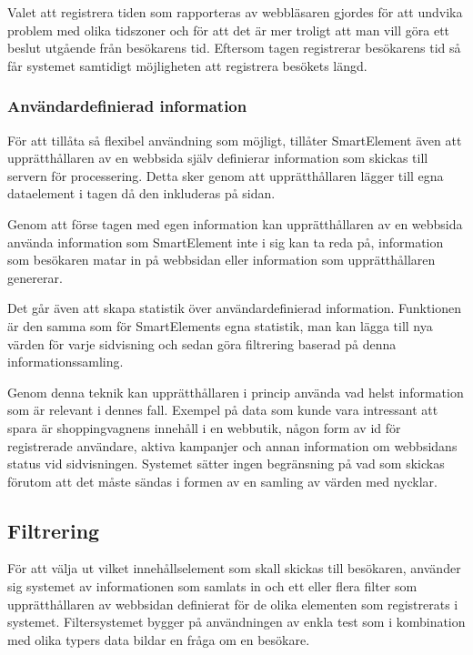 Valet att registrera tiden som rapporteras av webbläsaren gjordes för att undvika problem med olika tidszoner och för att det är mer troligt att man vill göra ett beslut utgående från besökarens tid. Eftersom tagen registrerar besökarens tid så får systemet samtidigt möjligheten att registrera besökets längd.

\subsubsection{Användardefinierad information}

För att tillåta så flexibel användning som möjligt, tillåter SmartElement även att upprätthållaren av en webbsida själv definierar information som skickas till servern för processering. Detta sker genom att upprätthållaren lägger till egna dataelement i tagen då den inkluderas på sidan.

Genom att förse tagen med egen information kan upprätthållaren av en webbsida använda information som SmartElement inte i sig kan ta reda på, information som besökaren matar in på webbsidan eller information som upprätthållaren genererar.

Det går även att skapa statistik över användardefinierad information. Funktionen är den samma som för SmartElements egna statistik, man kan lägga till nya värden för varje sidvisning och sedan göra filtrering baserad på denna informationssamling.

Genom denna teknik kan upprätthållaren i princip använda vad helst information som är relevant i dennes fall. Exempel på data som kunde vara intressant att spara är shoppingvagnens innehåll i en webbutik, någon form av id för registrerade användare, aktiva kampanjer och annan information om webbsidans status vid sidvisningen. Systemet sätter ingen begränsning på vad som skickas förutom att det måste sändas i formen av en samling av värden med nycklar.

\subsection{Filtrering}


För att välja ut vilket innehållselement som skall skickas till besökaren, använder sig systemet av informationen som samlats in och ett eller flera filter som upprätthållaren av webbsidan definierat för de olika elementen som registrerats i systemet. Filtersystemet bygger på användningen av enkla test som i kombination med olika typers data bildar en fråga om en besökare.

